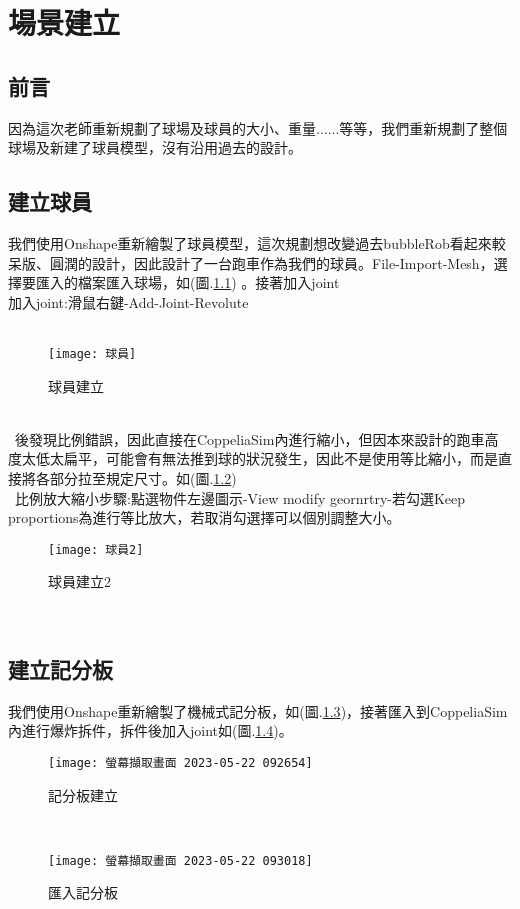 \chapter{場景建立}
\section{前言}
因為這次老師重新規劃了球場及球員的大小、重量......等等，我們重新規劃了整個球場及新建了球員模型，沒有沿用過去的設計。\\
\section{建立球員}
我們使用Onshape重新繪製了球員模型，這次規劃想改變過去bubbleRob看起來較呆版、圓潤的設計，因此設計了一台跑車作為我們的球員。File-Import-Mesh，選擇要匯入的檔案匯入球場，如(圖.\ref{球員建立}) 。接著加入joint\\
加入joint:滑鼠右鍵-Add-Joint-Revolute\\
\
\begin{figure}[hbt!]
\begin{center}
\texttt{[image: 球員]}
\caption{\Large 球員建立}\label{球員建立}
\end{center}
\end{figure}
\\
\
後發現比例錯誤，因此直接在CoppeliaSim內進行縮小，但因本來設計的跑車高度太低太扁平，可能會有無法推到球的狀況發生，因此不是使用等比縮小，而是直接將各部分拉至規定尺寸。如(圖.\ref{球員建立2})\\
\
比例放大縮小步驟:點選物件左邊圖示-View modify geornrtry-若勾選Keep proportions為進行等比放大，若取消勾選擇可以個別調整大小。\
\begin{figure}[hbt!]
\begin{center}
\texttt{[image: 球員2]}
\caption{\Large 球員建立2}\label{球員建立2}
\end{center}
\end{figure}\
\section{建立記分板}
我們使用Onshape重新繪製了機械式記分板，如(圖.\ref{記分板建立})，接著匯入到CoppeliaSim內進行爆炸拆件，拆件後加入joint如(圖.\ref{匯入記分板})。
\begin{figure}[hbt!]
\begin{center}
\texttt{[image: 螢幕擷取畫面 2023-05-22 092654]}
\caption{\Large 記分板建立}\label{記分板建立}
\end{center}
\end{figure}\
\begin{figure}[hbt!]
\begin{center}
\texttt{[image: 螢幕擷取畫面 2023-05-22 093018]}
\caption{\Large 匯入記分板}\label{匯入記分板}
\end{center}
\end{figure}\
\newpage
